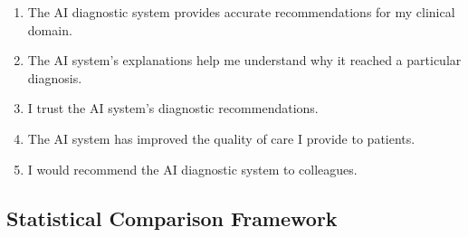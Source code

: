 \begin{enumerate}[label=\textbf{AI\arabic*.}]
    \item The AI diagnostic system provides accurate recommendations for my clinical domain. \hfill {}    
    \item The AI system's explanations help me understand why it reached a particular diagnosis. \hfill {}    
    \item I trust the AI system's diagnostic recommendations. \hfill {}    
    \item The AI system has improved the quality of care I provide to patients. \hfill {}    
    \item I would recommend the AI diagnostic system to colleagues. \hfill {}    
\end{enumerate}

\subsection{Statistical Comparison Framework}

